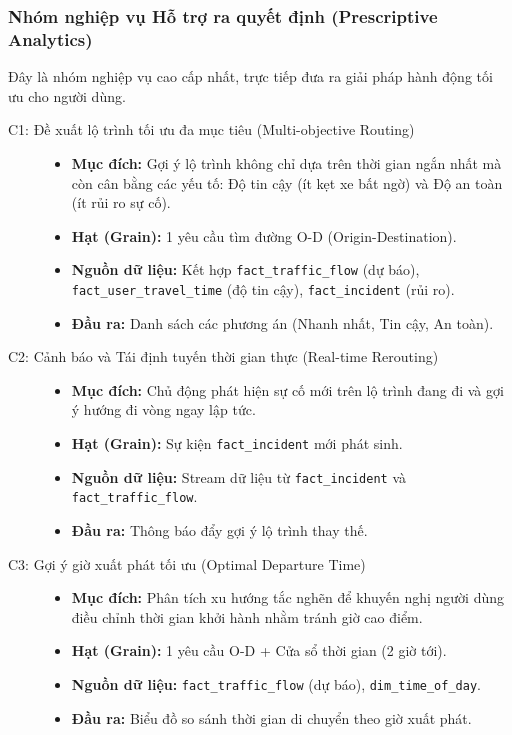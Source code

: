 \subsubsection{Nhóm nghiệp vụ Hỗ trợ ra quyết định (Prescriptive Analytics)}

Đây là nhóm nghiệp vụ cao cấp nhất, trực tiếp đưa ra giải pháp hành động tối ưu cho người dùng.

\begin{description}
    \item[C1: Đề xuất lộ trình tối ưu đa mục tiêu (Multi-objective Routing)]\hfill
    \begin{itemize}
        \item \textbf{Mục đích:} Gợi ý lộ trình không chỉ dựa trên thời gian ngắn nhất mà còn cân bằng các yếu tố: Độ tin cậy (ít kẹt xe bất ngờ) và Độ an toàn (ít rủi ro sự cố).
        \item \textbf{Hạt (Grain):} 1 yêu cầu tìm đường O-D (Origin-Destination).
        \item \textbf{Nguồn dữ liệu:} Kết hợp \texttt{fact\_traffic\_flow} (dự báo), \texttt{fact\_user\_travel\_time} (độ tin cậy), \texttt{fact\_incident} (rủi ro).
        \item \textbf{Đầu ra:} Danh sách các phương án (Nhanh nhất, Tin cậy, An toàn).
    \end{itemize}

    \item[C2: Cảnh báo và Tái định tuyến thời gian thực (Real-time Rerouting)]\hfill
    \begin{itemize}
        \item \textbf{Mục đích:} Chủ động phát hiện sự cố mới trên lộ trình đang đi và gợi ý hướng đi vòng ngay lập tức.
        \item \textbf{Hạt (Grain):} Sự kiện \texttt{fact\_incident} mới phát sinh.
        \item \textbf{Nguồn dữ liệu:} Stream dữ liệu từ \texttt{fact\_incident} và \texttt{fact\_traffic\_flow}.
        \item \textbf{Đầu ra:} Thông báo đẩy gợi ý lộ trình thay thế.
    \end{itemize}

    \item[C3: Gợi ý giờ xuất phát tối ưu (Optimal Departure Time)]\hfill
    \begin{itemize}
        \item \textbf{Mục đích:} Phân tích xu hướng tắc nghẽn để khuyến nghị người dùng điều chỉnh thời gian khởi hành nhằm tránh giờ cao điểm.
        \item \textbf{Hạt (Grain):} 1 yêu cầu O-D + Cửa sổ thời gian (2 giờ tới).
        \item \textbf{Nguồn dữ liệu:} \texttt{fact\_traffic\_flow} (dự báo), \texttt{dim\_time\_of\_day}.
        \item \textbf{Đầu ra:} Biểu đồ so sánh thời gian di chuyển theo giờ xuất phát.
    \end{itemize}
\end{description}

